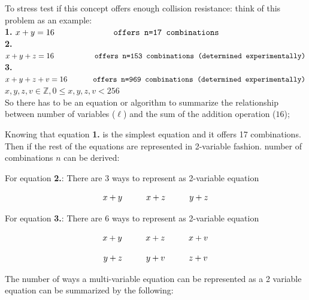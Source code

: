 \documentclass[11pt]{article}
\theoremstyle{definition}
\theoremstyle{remark}
\begin{document}
To stress test if this concept offers enough collision resistance: think of this problem as an example:
\\
\textbf{1.} $x+y=16 \texttt{\hspace{2.3cm} offers n=17 combinations}$\\
\textbf{2.} $x+y+z=16 \texttt{\hspace{1.7cm} offers n=153 combinations (determined experimentally)}$\\
\textbf{3.} $x+y+z+v=16 \texttt{\hspace{1cm} offers n=969 combinations (determined experimentally)}$\\
$x,y,z,v \in \mathbb{Z}, 0 \leq x,y,z,v < 256$\\

So there has to be an equation or algorithm to summarize the relationship between number of variables ($\ell$) and the sum of the addition operation ($16$);

Knowing that equation \textbf{1.} is the simplest equation and it offers 17 combinations. Then if the rest of the equations are represented in 2-variable fashion. number of combinations $n$ can be derived:

For equation \textbf{2.}: There are 3 ways to represent as 2-variable equation
\begin{center}
\[
\hspace*{\fill} x + y \hspace{1cm} x + z \hspace{1cm} y + z \hspace*{\fill}
\]
\end{center}

For equation \textbf{3.}: There are 6 ways to represent as 2-variable equation
\begin{center}
\[
\hspace*{\fill} x + y \hspace{1cm} x + z \hspace{1cm} x + v \hspace*{\fill}
\]
\end{center}
\begin{center}
\[
\hspace*{\fill} y + z \hspace{1cm} y + v \hspace{1cm} z + v \hspace*{\fill}
\]
\end{center}

The number of ways a multi-variable equation can be represented as a 2 variable equation can be summarized by the following:
\end{document}
